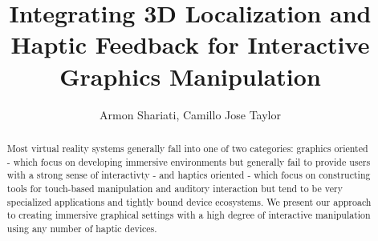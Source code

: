 \documentclass{IEEEtran}
\title{Integrating 3D Localization and Haptic Feedback for Interactive Graphics Manipulation}
\author{Armon Shariati, Camillo Jose Taylor}
\begin{document}
\setlength{\pdfpagewidth}{8.5in}
\setlength{\pdfpageheight}{11 in}
\maketitle

\begin{abstract}
    Most virtual reality systems generally fall into one of two categories:
    graphics oriented - which focus on developing immersive environments but
    generally fail to provide users with a strong sense of interactivty - and
    haptics oriented - which focus on constructing tools for touch-based
    manipulation and auditory interaction but tend to be very specialized
    applications and tightly bound device ecosystems. We present our approach
    to creating immersive graphical settings with a high degree of interactive
    manipulation using any number of haptic devices.
\end{abstract}






\end{document}
